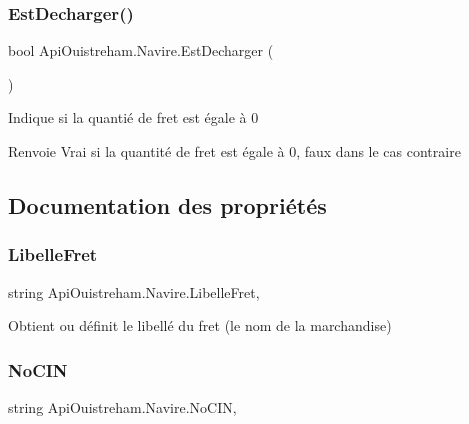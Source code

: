 \subsubsection{\texorpdfstring{Est\+Decharger()}{EstDecharger()}}
{\footnotesize\ttfamily bool Api\+Ouistreham.\+Navire.\+Est\+Decharger (\begin{DoxyParamCaption}{ }\end{DoxyParamCaption})}



Indique si la quantié de fret est égale à 0 

\begin{DoxyReturn}{Renvoie}
Vrai si la quantité de fret est égale à 0, faux dans le cas contraire
\end{DoxyReturn}


\subsection{Documentation des propriétés}
\mbox{\label{class_api_ouistreham_1_1_navire_a68c36073e4a1d2a9bf4c0eb35ea8d5f4}} 
\subsubsection{\texorpdfstring{Libelle\+Fret}{LibelleFret}}
{\footnotesize\ttfamily string Api\+Ouistreham.\+Navire.\+Libelle\+Fret\hspace{0.3cm}{\ttfamily [get]}, {\ttfamily [set]}}



Obtient ou définit le libellé du fret (le nom de la marchandise) 

\mbox{\label{class_api_ouistreham_1_1_navire_ac8267ba06c607b546aeef33d706cef20}} 
\subsubsection{\texorpdfstring{No\+C\+IN}{NoCIN}}
{\footnotesize\ttfamily string Api\+Ouistreham.\+Navire.\+No\+C\+IN\hspace{0.3cm}{\ttfamily [get]}, {\ttfamily [set]}}




